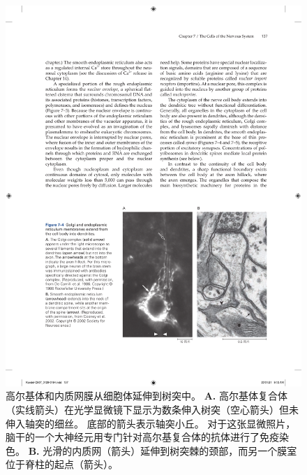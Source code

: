 \begin{figure}[htbp]
	\centering
	\includegraphics[width=0.8\linewidth]{chap07/fig_7_4}
	\caption{高尔基体和内质网膜从细胞体延伸到树突中。
		\textbf{A.} 高尔基体复合体（实线箭头）在光学显微镜下显示为数条伸入树突（空心箭头）但未伸入轴突的细丝。
		底部的箭头表示轴突小丘。
		对于这张显微照片，脑干的一个大神经元用专门针对高尔基复合体的抗体进行了免疫染色\cite{de1986heterogeneous}。
		\textbf{B.} 光滑的内质网（箭头）延伸到树突棘的颈部，而另一个膜室位于脊柱的起点（箭头）\cite{cooney2002endosomal}。}
	\label{fig:7_4}
\end{figure}


